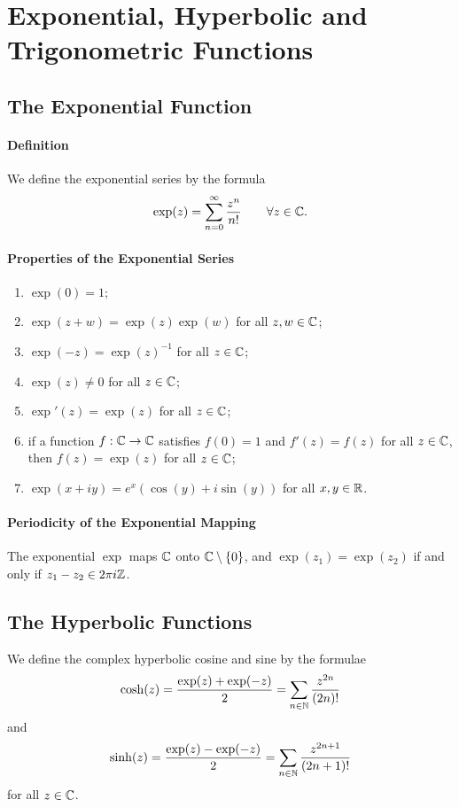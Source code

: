 \section{Exponential, Hyperbolic and Trigonometric Functions}
\subsection{The Exponential Function}
\paragraph{Definition}
We define the exponential series by the formula
\[\exp(z) = \sum_{n=0}^{\infty} \frac{z^n}{n!} \qquad \forall z \in \mathbb{C}.\]

\paragraph{Properties of the Exponential Series}
\begin{enumerate}
    \item \(\exp(0) = 1\);
    \item \(\exp(z + w) = \exp(z)\exp(w)\) for all \(z, w \in \mathbb{C}\);
    \item \(\exp(-z) = \exp(z)^{-1}\) for all \(z \in \mathbb{C}\);
    \item \(\exp(z) \neq 0\) for all \(z \in \mathbb{C}\);
    \item \(\exp'(z) = \exp(z)\) for all \(z \in \mathbb{C}\);
    \item if a function \(f: \mathbb{C} \to \mathbb{C}\) satisfies \(f(0) = 1\) and \(f'(z) = f(z)\) for all \(z \in \mathbb{C}\), then \(f(z) = \exp(z)\) for all \(z \in \mathbb{C}\);
    \item \(\exp(x + iy) = e^x(\cos(y) + i\sin(y))\) for all \(x,y \in \mathbb{R}\).
\end{enumerate}

\paragraph{Periodicity of the Exponential Mapping}
The exponential \(\exp\) maps \(\mathbb{C}\) onto \(\mathbb{C} \setminus \{0\}\), and \(\exp(z_1) = \exp(z_2)\) if and only if \(z_1 - z_2  \in 2\pi i\mathbb{Z}\).

\subsection{The Hyperbolic Functions}
We define the complex hyperbolic cosine and sine by the formulae
\[\cosh(z) = \frac{\exp(z) + \exp(-z)}{2} = \sum_{n\in\mathbb{N}} \frac{z^{2n}}{(2n)!}\]
and
\[\sinh(z) = \frac{\exp(z) - \exp(-z)}{2} = \sum_{n\in\mathbb{N}} \frac{z^{2n+1}}{(2n + 1)!}\]
for all \(z \in \mathbb{C}\).

